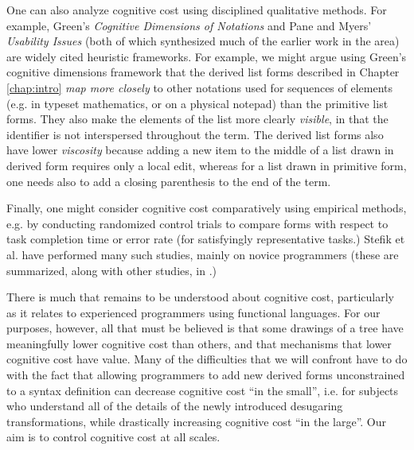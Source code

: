 One can also analyze cognitive cost using disciplined qualitative methods. For example, Green's \emph{Cognitive Dimensions of Notations} \cite{Green89,green1996usability} and Pane and Myers' \emph{Usability Issues} \cite{pane1996usability} (both of which synthesized much of the earlier work in the area) are widely cited heuristic frameworks. For example, we might argue using Green's cognitive dimensions framework that the derived list forms described in Chapter \ref{chap:intro} \emph{map more closely} to other notations used for sequences of elements (e.g. in typeset mathematics, or on a physical notepad) than the primitive list forms. They also make the elements of the list more clearly \emph{visible}, in that the identifier  is not interspersed throughout the term. The derived list forms also have lower \emph{viscosity} because adding a new item to the middle of a list drawn in derived form requires only a local edit, whereas for a list drawn in primitive form, one needs also to add a closing parenthesis to the end of the term.

Finally, one might consider cognitive cost comparatively using empirical methods, e.g. by conducting randomized control trials to compare forms with respect to task completion time or error rate (for satisfyingly representative tasks.) Stefik et al. have performed many such studies, mainly on novice programmers (these are summarized, along with other studies, in \cite{journals/jeric/StefikS13}.)

There is much that remains to be understood about cognitive cost, particularly as it relates to experienced programmers using functional languages. For our purposes, however, all that must be believed is that some drawings of a tree have meaningfully lower cognitive cost than others,  and that mechanisms that lower cognitive cost have value. Many of the difficulties that we will confront have to do with the fact that allowing programmers to add new derived forms unconstrained to a syntax definition can decrease cognitive cost ``in the small'', i.e. for subjects who understand all of the details of the newly introduced desugaring transformations, while drastically increasing cognitive cost ``in the large''. Our aim is to control cognitive cost at all scales. %



